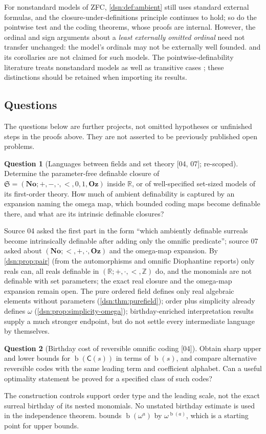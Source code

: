 \documentclass[11pt,a4paper]{article}
\numberwithin{equation}{section}
\theoremstyle{definition}
\newtheorem{question}[question]{Question}
\theoremstyle{remark}
\newcommand{\No}{\mathbf{No}}
\newcommand{\Oz}{\mathbf{Oz}}
\newcommand{\Z}{\mathbb Z}
\newcommand{\R}{\mathbb R}
\newcommand{\bd}{\operatorname{b}}
\newcommand{\Code}{\mathsf C}
\newcommand{\src}[1]{\textup{\textsf{\small[#1]}}}
\begin{document}
For nonstandard models of ZFC, \cref{dsn:def:ambient} still uses standard
external formulas, and the closure-under-definitions principle continues to
hold; so do the pointwise test and the coding theorems, whose proofs are
internal. However, the ordinal and sign arguments about a \emph{least
externally omitted ordinal} need not transfer unchanged: the model's
ordinals may not be externally well founded.  and its
corollaries are not claimed for such models. The pointwise-definability
literature treats nonstandard models as well as transitive cases
\cite{HLR}; these distinctions should be retained when importing its
results.

\subsection{Questions}

The questions below are further projects, not omitted hypotheses or
unfinished steps in the proofs above. They are not asserted to be
previously published open problems.

\begin{question}[Languages between fields and set theory \src{04, 07}; re-scoped]\label{dsn:q:languages}
Determine the parameter-free definable closure of
$\mathfrak S=(\No;+,-,\cdot,<,0,1,\Oz)$ inside $\R$, or of well-specified
set-sized models of its first-order theory. How much of ambient
definability is captured by an expansion naming the omega map, which bounded
coding maps become definable there, and what are its intrinsic definable
closures?
\end{question}
Source 04 asked the first part in the form ``which ambiently definable
surreals become intrinsically definable after adding only the omnific
predicate''; source 07 asked about $(\No;<,+,\cdot,\Oz)$ and the omega-map
expansion. By \cref{dsn:prop:pair} (from the automorphisms and omnific
Diophantine reports) only reals can, all reals definable in
$(\R;+,\cdot,<,\Z)$ do, and the monomials are not definable with set
parameters; the exact real closure and the omega-map expansion remain open.
The pure ordered field defines only real algebraic elements without
parameters (\cref{dsn:thm:purefield}); order plus simplicity already
defines $\omega$ (\cref{dsn:prop:simplicity-omega}); birthday-enriched
interpretation results supply a much stronger endpoint, but do not settle
every intermediate language by themselves.

\begin{question}[Birthday cost of reversible omnific coding \src{04}]\label{dsn:q:cost-birthday}
Obtain sharp upper and lower bounds for $\bd(\Code(s))$ in terms of
$\bd(s)$, and compare alternative reversible codes with the same
leading term and coefficient alphabet. Can a useful optimality
statement be proved for a specified class of such codes?
\end{question}
The construction controls support order type and the leading scale,
not the exact surreal birthday of its nested monomials. No unstated
birthday estimate is used in the independence theorem.
 bounds $\bd(\omega^a)$ by
$\omega^{\bd(a)}$, which is a starting point for upper bounds.
\end{document}

